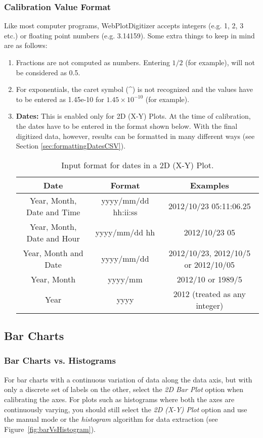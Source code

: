 \documentclass[letterpaper, 11pt]{article}
\begin{document}
\subsubsection{Calibration Value Format}
\label{sec:formattingInput}
Like most computer programs, WebPlotDigitizer accepts integers (e.g. 1, 2, 3 etc.) or floating point numbers (e.g. 3.14159). Some extra things to keep in mind are as follows:
\begin{enumerate}
\item{Fractions are not computed as numbers. Entering $1/2$ (for example), will not be considered as 0.5.}
\item{For exponentials, the caret symbol (\^{}) is not recognized and the values have to be entered as 1.45e-10 for $1.45 \times 10^{-10}$ (for example).}
\item{{\bf Dates:} This is enabled only for 2D (X-Y) Plots. At the time of calibration, the dates have to be entered in the format shown below. With the final digitized data, however, results can be formatted in many different ways (see Section \ref{sec:formattingDatesCSV}).
\begin{center}
\begin{table}[h]	
\caption{Input format for dates in a 2D (X-Y) Plot.}
\begin{tabular}{|c|c|c|}
\hline
Date & Format & Examples\\
\hline
Year, Month, Date and Time & yyyy/mm/dd hh:ii:ss & 2012/10/23 05:11:06.25\\
Year, Month, Date and Hour & yyyy/mm/dd hh & 2012/10/23 05\\ 
Year, Month and Date & yyyy/mm/dd & 2012/10/23, 2012/10/5 or 2012/10/05\\
Year, Month & yyyy/mm & 2012/10 or 1989/5\\
Year & yyyy & 2012 (treated as any integer)\\
\hline
\end{tabular}
\end{table}
\end{center}
}
\end{enumerate}


\subsection{Bar Charts}

\subsubsection{Bar Charts vs. Histograms}
For bar charts with a continuous variation of data along the data axis, but with only a discrete set of labels on the other, select the \emph{2D Bar Plot} option when calibrating the axes. For plots such as histograms where both the axes are continuously varying, you should still select the \emph{2D (X-Y) Plot} option and use the manual mode or the \emph{histogram} algorithm for data extraction (see Figure~\ref{fig:barVsHistogram}).
\end{document}
